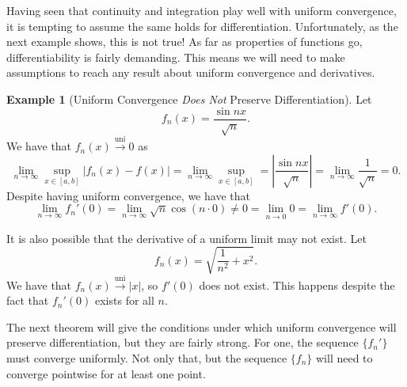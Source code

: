 \documentclass{article}
\newcommand{\uni}{\overset{\text{uni}}{\to}}
\theoremstyle{definition}
\newtheorem{example}{Example}[section]
\begin{document}
	Having seen that continuity and integration play well with uniform convergence, it is tempting to assume the same holds for differentiation. Unfortunately, as the next example shows, this is not true! As far as properties of functions go, differentiability is fairly demanding. This means we will need to make assumptions to reach any result about uniform convergence and derivatives. 
	\begin{example}[Uniform Convergence \textit{Does Not} Preserve Differentiation]
		Let $$ f_n(x)=\frac{\sin nx}{\sqrt{n}}. $$ We have that $ f_n(x)\uni 0 $ as  $$  \lim\limits_{n\to\infty}\sup_{x\in [a,b]}|f_n(x)-f(x)|=\lim\limits_{n\to\infty}\sup_{x\in [a,b]}=	\left\lvert \frac{\sin nx}{\sqrt{n}} \right\rvert=\lim\limits_{n\to\infty}\frac{1}{\sqrt{n}}=0.$$ Despite having uniform convergence, we have that $$ \lim_{n\to\infty}f_n'(0)=\lim_{n\to\infty}\sqrt{n}\cos (n
		\cdot0)\neq 0=\lim_{n\to 0}0=\lim_{n\to\infty}f'(0).$$
		
		It is also possible that the derivative of a uniform limit may not exist. Let $$ f_n(x)=\sqrt{\frac{1}{n^2}+x^2}.$$ We have that $ f_n(x)\uni|x| $, so $ f'(0) $ does not exist. This happens despite the fact that $ f_n'(0) $ exists for all $ n $. 
	\end{example}
	
	The next theorem will give the conditions under which uniform convergence will preserve differentiation, but they are fairly strong. For one, the sequence $ \{f_n'\} $ must converge uniformly. Not only that, but the sequence $ \{f_n\} $ will need to converge pointwise for at least one point.  
	
\end{document}
